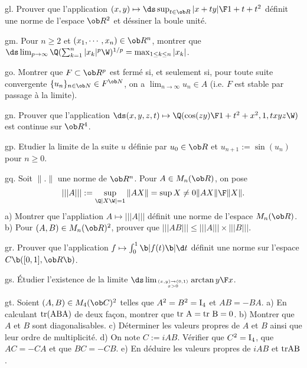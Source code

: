 \exo [Level=2,Fight=1,Learn=1,Type=\Exercices,Field=\Normes,Origin=] gl. 
Prouver que l'application $(x,y)\mapsto\ds\sup_{t\in\ob R}{|x+ty|\F1+t+t^2}$ 
définit une norme de l'espace $\ob R^2$ et déssiner la boule unité. 

\exo [Level=1,Fight=2,Learn=1,Type=\Exercices,Field=\Suites,Origin=] gm. 
Pour $n\ge2$ et $(x_1,\cdots, x_n)\in\ob R^n$, montrer que 
$\ds \lim_{p\to\infty}\Q(\sum_{k=1}^n|x_k|^p\W)^{1/p}=\max_{1\le k\le n}|x_k|$.

\exo [Level=2,Fight=2,Learn=2,Type=\Cours,Field=\Topologie,Origin=] go. Montrer que $F\subset \ob R^p$ est fermé si, 
et seulement si, pour toute suite convergente $\{u_n\}_{n\in\ob N}\in F^{\ob N}$, on a $\lim_{n\to\infty}u_n\in A$ 
(i.e. $F$ est stable par passage à la limite). %

\exo [Level=2,Fight=0,Learn=0,Type=\TravauxDirigés,Field=\Continuité,Origin=] gn. 
Prouver que 
l'application $\ds(x,y,z,t)\mapsto \Q({\cos (zy)\F1+t^2+x^2},1,txyz\W)$ 
est continue sur $\ob R^4$. 

\exo [Level=1,Fight=2,Learn=2,Type=\Exercices,Field=\Suites,Origin=] gp. 
Etudier la limite de la suite $u$ définie par $u_0\in\ob R$ et $u_{n+1}:=\sin(u_n)$ pour $n\ge0$.  

\exo [Level=2,Fight=2,Learn=2,Type=\Cours,Field=\Normes,Origin=\MP] gq. 
Soit $\|.\|$ une norme de $\ob R^n$. Pour $A\in\sc M_n(\ob R)$, 
on pose $$
|||A|||:=\sup_{\Q|X\W|=1}\|AX\|=\sup{X\neq0}{\|AX\|\F \|X\|}.
$$ 
a) Montrer que l'appliation $A\mapsto|||A|||$ définit 
une norme de l'espace $\sc M_n(\ob R)$. \pn
b) Pour $(A,B)\in\sc M_n(\ob R)^2$, prouver que $|||AB|||\le |||A|||\times|||B|||$. %

\exo [Level=2,Fight=1,Learn=1,Type=\Cours,Field=\Normes,Origin=] gr. 
Prouver que l'application $f\mapsto\int_0^1\b|f(t)\b|\d t$ définit une norme sur l'espace $\sc C\b([0,1],\ob R\b)$. 

\exo [Level=2,Fight=0,Learn=0,Type=\Exercices,Field=\Continuité,Origin=] gs. 
\'Etudier l'existence de la limite $\ds \lim_{(x,y)\to(0,1)\atop x>0}\arctan{y\F x}$. 

\exo [Level=2,Fight=1,Learn=1,Type=\Colles,Field=\Diagonalisation,Origin=] gt. 
Soient $(A,B)\in\sc M_4(\ob C)^2$ telles que $A^2=B^2=\rm I_4$ et $AB=-BA$. \pn
a) En calculant $\rm{tr}(ABA)$ de deux fa\c con, montrer que $\rm{tr}\ A=\rm{tr}\ B=0$. \pn
b) Montrer que $A$ et $B$ sont diagonalisables. \pn
c) Déterminer les valeurs propres de $A$ et $B$ ainsi que leur ordre de multiplicité. \pn
d) On note $C:=iAB$. Vérifier que $C^2=\rm I_4$, que $AC=-CA$ et que $BC=-CB$. \pn
e) En déduire les valeurs propres de $iAB$ et $\rm{tr }AB$. 

